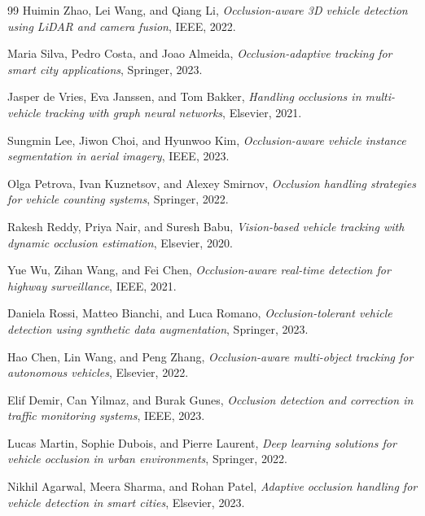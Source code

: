 \documentclass[12pt,a4paper]{report}
\theoremstyle{definition}
\theoremstyle{remark}
\begin{document}
\begin{thebibliography}{99}
	Huimin Zhao, Lei Wang, and Qiang Li,
	\emph{Occlusion-aware 3D vehicle detection using LiDAR and camera fusion},
	IEEE, 2022.

	Maria Silva, Pedro Costa, and Joao Almeida,
	\emph{Occlusion-adaptive tracking for smart city applications},
	Springer, 2023.

	Jasper de Vries, Eva Janssen, and Tom Bakker,
	\emph{Handling occlusions in multi-vehicle tracking with graph neural networks},
	Elsevier, 2021.

	Sungmin Lee, Jiwon Choi, and Hyunwoo Kim,
	\emph{Occlusion-aware vehicle instance segmentation in aerial imagery},
	IEEE, 2023.

	Olga Petrova, Ivan Kuznetsov, and Alexey Smirnov,
	\emph{Occlusion handling strategies for vehicle counting systems},
	Springer, 2022.

	Rakesh Reddy, Priya Nair, and Suresh Babu,
	\emph{Vision-based vehicle tracking with dynamic occlusion estimation},
	Elsevier, 2020.

	Yue Wu, Zihan Wang, and Fei Chen,
	\emph{Occlusion-aware real-time detection for highway surveillance},
	IEEE, 2021.

	Daniela Rossi, Matteo Bianchi, and Luca Romano,
	\emph{Occlusion-tolerant vehicle detection using synthetic data augmentation},
	Springer, 2023.

	Hao Chen, Lin Wang, and Peng Zhang,
	\emph{Occlusion-aware multi-object tracking for autonomous vehicles},
	Elsevier, 2022.

	Elif Demir, Can Yilmaz, and Burak Gunes,
	\emph{Occlusion detection and correction in traffic monitoring systems},
	IEEE, 2023.

	Lucas Martin, Sophie Dubois, and Pierre Laurent,
	\emph{Deep learning solutions for vehicle occlusion in urban environments},
	Springer, 2022.

	Nikhil Agarwal, Meera Sharma, and Rohan Patel,
	\emph{Adaptive occlusion handling for vehicle detection in smart cities},
	Elsevier, 2023.
\end{thebibliography}
\end{document}
